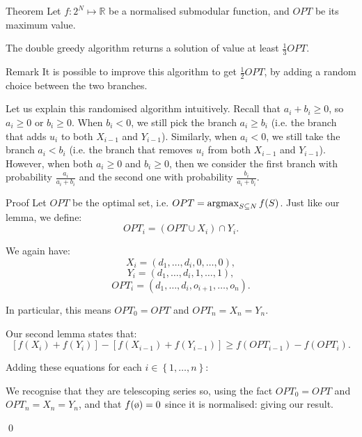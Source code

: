 \documentclass[a4paper]{article}
\begin{document}
\begin{parag}{Theorem}
    Let $f: 2^N \mapsto \mathbb{R}$ be a normalised submodular function, and $OPT$ be its maximum value.

    The double greedy algorithm returns a solution of value at least $\frac{1}{3} OPT$.

    \begin{subparag}{Remark}
        It is possible to improve this algorithm to get $\frac{1}{2} OPT$, by adding a random choice between the two branches.

        Let us explain this randomised algorithm intuitively. Recall that $a_i + b_i \geq 0$, so $a_i \geq 0$ or $b_i \geq 0$. When $b_i < 0$, we still pick the branch $a_i \geq b_i$ (i.e. the branch that adds $u_i$ to both $X_{i-1}$ and $Y_{i-1}$). Similarly, when $a_i < 0$, we still take the branch $a_i < b_i$ (i.e. the branch that removes $u_i$ from both $X_{i-1}$ and $Y_{i-1}$). However, when both $a_i \geq 0$ and $b_i \geq 0$, then we consider the first branch with probability $\frac{a_i}{a_i + b_i}$ and the second one with probability $\frac{b_i}{a_i + b_i}$. 
    \end{subparag}

    \begin{subparag}{Proof}
        Let $OPT$ be the optimal set, i.e. $OPT = \argmax_{S \subseteq N} f\left(S\right)$. Just like our lemma, we define: 
        \[OPT_i = \left(OPT \cup X_i\right) \cap Y_i.\]

        We again have: 
        \[X_i = \left(d_1, \ldots, d_i, 0, \ldots, 0\right),\] 
        \[Y_i = \left(d_1, \ldots, d_i, 1, \ldots, 1\right),\]
        \[OPT_i = \left(d_1, \ldots, d_{i}, o_{i+1}, \ldots, o_n\right).\]

        In particular, this means $OPT_0 = OPT$ and $OPT_n = X_n = Y_n$.

        Our second lemma states that:
        \[\left[f\left(X_i\right) + f\left(Y_i\right)\right] - \left[f\left(X_{i-1}\right) + f\left(Y_{i-1}\right)\right] \geq f\left(OPT_{i-1}\right) - f\left(OPT_i\right).\]

        Adding these equations for each $i \in \left\{1, \ldots, n\right\}$:
        
        We recognise that they are telescoping series so, using the fact $OPT_0 = OPT$ and $OPT_n = X_n = Y_n$, and that $f\left(\o\right) = 0$ since it is normalised:
        giving our result.

        \qed

    \end{subparag}
\end{parag}
\end{document}
